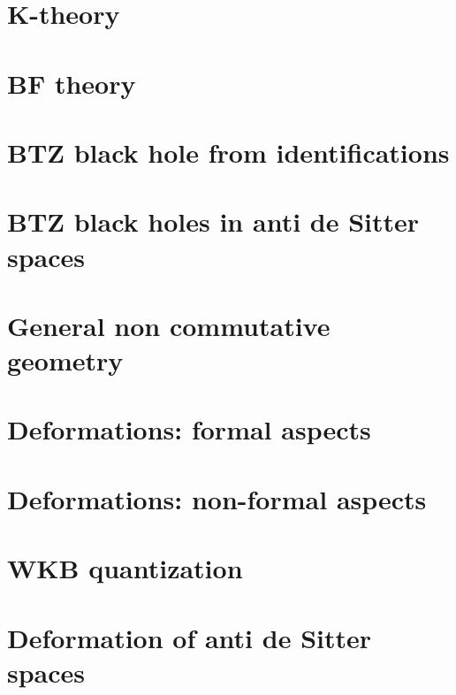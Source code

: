 \documentclass[a4paper,twoside,11pt]{book}
\begin{document}
\chapter{K-theory}


\chapter{BF theory}


\chapter{BTZ black hole from identifications}




\chapter{BTZ black holes in anti de Sitter spaces}                  \label{ChapBHinAdS}









\chapter{General non commutative geometry}




\chapter{Deformations: formal aspects}          \label{ChapDefo}


\chapter{Deformations: non-formal aspects}




\chapter{WKB quantization}


\chapter{Deformation of anti de Sitter spaces}   \label{ChDefoBH}

\end{document}
